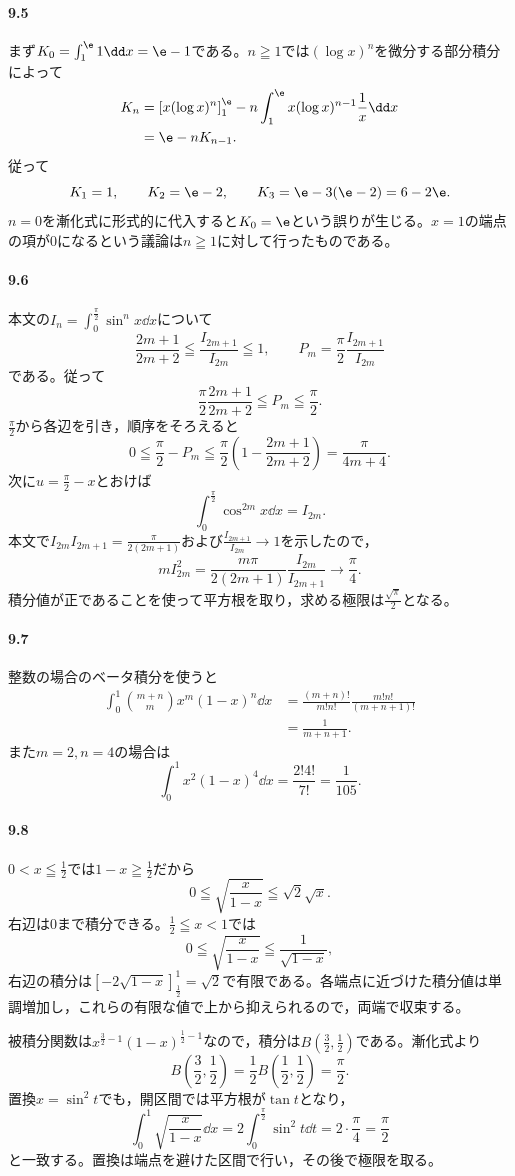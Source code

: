 \paragraph{9.5}
まず$K_0=\int_1^{\e}1\dd x=\e-1$である。$n\geqq1$では$(\log x)^n$を微分する部分積分によって
\begin{align*}
 K_n
 &=\left[x(\log x)^n\right]_1^{\e}
   -n\int_1^{\e}x(\log x)^{n-1}\frac1x\dd x\\
 &=\e-nK_{n-1}.
\end{align*}
従って
\[
 K_1=1,\qquad K_2=\e-2,\qquad K_3=\e-3(\e-2)=6-2\e.
\]
$n=0$を漸化式に形式的に代入すると$K_0=\e$という誤りが生じる。$x=1$の端点の項が$0$になるという議論は$n\geqq1$に対して行ったものである。

\paragraph{9.6}
本文の$I_n=\int_0^{\frac{\pi}{2}}\sin^n x\dd x$について
\[
 \frac{2m+1}{2m+2}
 \leqq\frac{I_{2m+1}}{I_{2m}}\leqq1,
 \qquad
 P_m=\frac{\pi}{2}\frac{I_{2m+1}}{I_{2m}}
\]
である。従って
\[
 \frac{\pi}{2}\frac{2m+1}{2m+2}
 \leqq P_m\leqq\frac{\pi}{2}.
\]
$\frac{\pi}{2}$から各辺を引き，順序をそろえると
\[
 0\leqq\frac{\pi}{2}-P_m
 \leqq\frac{\pi}{2}\left(1-\frac{2m+1}{2m+2}\right)
 =\frac{\pi}{4m+4}.
\]
次に$u=\frac{\pi}{2}-x$とおけば
\[
 \int_0^{\frac{\pi}{2}}\cos^{2m}x\dd x=I_{2m}.
\]
本文で$I_{2m}I_{2m+1}=\frac{\pi}{2(2m+1)}$および$\frac{I_{2m+1}}{I_{2m}}\to1$を示したので，
\[
 mI_{2m}^2
 =\frac{m\pi}{2(2m+1)}\frac{I_{2m}}{I_{2m+1}}
 \longrightarrow\frac{\pi}{4}.
\]
積分値が正であることを使って平方根を取り，求める極限は$\frac{\sqrt\pi}{2}$となる。

\paragraph{9.7}
整数の場合のベータ積分を使うと
\begin{align*}
 \int_0^1\binom{m+n}{m}x^m(1-x)^n\dd x
 &=\frac{(m+n)!}{m!n!}\frac{m!n!}{(m+n+1)!}\\
 &=\frac1{m+n+1}.
\end{align*}
また$m=2,n=4$の場合は
\[
 \int_0^1x^2(1-x)^4\dd x
 =\frac{2!4!}{7!}=\frac1{105}.
\]

\paragraph{9.8}
$0<x\leqq\frac12$では$1-x\geqq\frac12$だから
\[
 0\leqq\sqrt{\frac{x}{1-x}}\leqq\sqrt2\sqrt x.
\]
右辺は$0$まで積分できる。$\frac12\leqq x<1$では
\[
 0\leqq\sqrt{\frac{x}{1-x}}\leqq\frac1{\sqrt{1-x}},
\]
右辺の積分は$[-2\sqrt{1-x}]_{\frac12}^{1}=\sqrt2$で有限である。各端点に近づけた積分値は単調増加し，これらの有限な値で上から抑えられるので，両端で収束する。

被積分関数は$x^{\frac32-1}(1-x)^{\frac12-1}$なので，積分は$B\left(\frac32,\frac12\right)$である。漸化式より
\[
 B\left(\frac32,\frac12\right)
 =\frac12 B\left(\frac12,\frac12\right)=\frac{\pi}{2}.
\]
置換$x=\sin^2t$でも，開区間では平方根が$\tan t$となり，
\[
 \int_0^1\sqrt{\frac{x}{1-x}}\dd x
 =2\int_0^{\frac{\pi}{2}}\sin^2t\dd t
 =2\cdot\frac{\pi}{4}=\frac{\pi}{2}
\]
と一致する。置換は端点を避けた区間で行い，その後で極限を取る。
